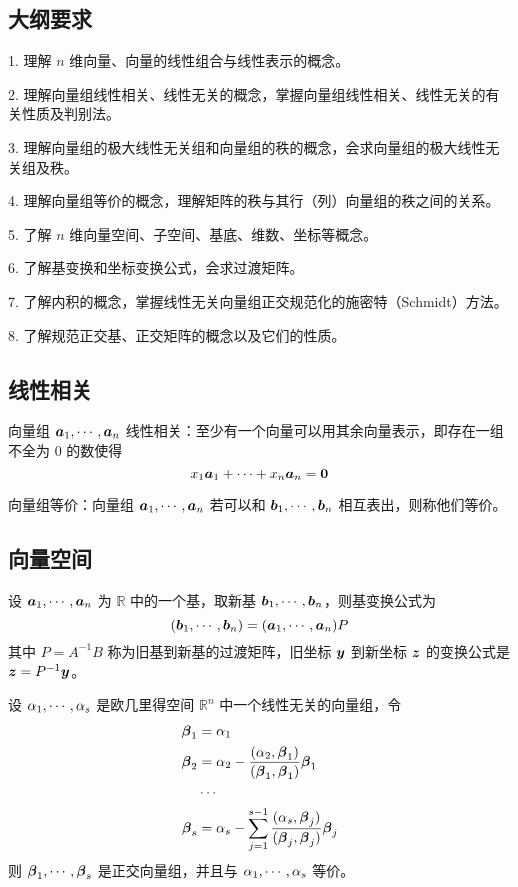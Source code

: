 \subsection{大纲要求}

1. 理解 $n$ 维向量、向量的线性组合与线性表示的概念。

2. 理解向量组线性相关、线性无关的概念，掌握向量组线性相关、线性无关的有关性质及判别法。

3. 理解向量组的极大线性无关组和向量组的秩的概念，会求向量组的极大线性无关组及秩。

4. 理解向量组等价的概念，理解矩阵的秩与其行（列）向量组的秩之间的关系。

5. 了解 $n$ 维向量空间、子空间、基底、维数、坐标等概念。

6. 了解基变换和坐标变换公式，会求过渡矩阵。

7. 了解内积的概念，掌握线性无关向量组正交规范化的施密特（Schmidt）方法。

8. 了解规范正交基、正交矩阵的概念以及它们的性质。

\subsection{线性相关}

向量组 $\boldsymbol{a}_1,\cdots,\boldsymbol{a}_n$ 线性相关：至少有一个向量可以用其余向量表示，即存在一组不全为 $0$ 的数使得
\[ x_1 \boldsymbol{a}_1 + \cdots + x_n \boldsymbol{a}_n = \boldsymbol{0} \]

向量组等价：向量组 $\boldsymbol{a}_1,\cdots,\boldsymbol{a}_n$ 若可以和 $\boldsymbol{b}_1,\cdots,\boldsymbol{b}_n$ 相互表出，则称他们等价。

\subsection{向量空间}

设 $\boldsymbol{a}_1,\cdots,\boldsymbol{a}_n$ 为 $\mathbb{R}$ 中的一个基，取新基 $\boldsymbol{b}_1,\cdots,\boldsymbol{b}_n$，则基变换公式为
\[ (\boldsymbol{b}_1,\cdots,\boldsymbol{b}_n) =  (\boldsymbol{a}_1,\cdots,\boldsymbol{a}_n)P \]
其中 $P = A^{-1} B$ 称为旧基到新基的过渡矩阵，旧坐标 $\boldsymbol{y}$ 到新坐标 $\boldsymbol{z}$ 的变换公式是 $\boldsymbol{z} = P^{-1} \boldsymbol{y}$。

\begin{theorem}
	设 $\alpha_1,\cdots,\alpha_s$ 是欧几里得空间 $\mathbb{R}^n$ 中一个线性无关的向量组，令
	\[
		\begin{aligned}
			\boldsymbol{\beta}_1 & =\alpha_1                                                                                              \\
			\boldsymbol{\beta}_2 & =\alpha_2 - \frac{(\alpha_2,\boldsymbol{\beta}_1)}{(\boldsymbol{\beta}_1,\boldsymbol{\beta}_1)}\boldsymbol{\beta}_1                \\
			              & \cdots                                                                                                 \\
			\boldsymbol{\beta}_s & = \alpha_s-\sum_{j=1}^{s-1}\frac{(\alpha_s,\boldsymbol{\beta}_j)}{(\boldsymbol{\beta}_j,\boldsymbol{\beta}_j)}\boldsymbol{\beta}_j
		\end{aligned}
	\]
	则 $\boldsymbol{\beta}_1,\cdots,\boldsymbol{\beta}_s$ 是正交向量组，并且与 $\alpha_1,\cdots,\alpha_s$ 等价。
\end{theorem}

